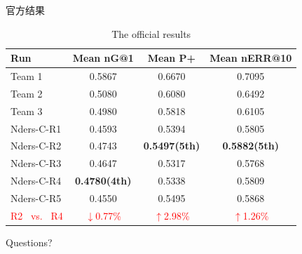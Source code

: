 \documentclass[aspectratio=169]{beamer}
\begin{document}
  \begin{frame}{官方结果}
    \begin{table}
\centering
\caption{The official results}
\label{tab:commands}
\begin{minipage}{\columnwidth}
\begin{center}
\begin{tabular}{|l|c|c|c|}
\hline
 Run        &  Mean nG@1  &  Mean P+  &  Mean nERR@10  \\ \hline
 Team 1 & 0.5867 & 0.6670 & 0.7095 \\ \hline
 Team 2 & 0.5080 & 0.6080 & 0.6492 \\ \hline
 Team 3 & 0.4980 & 0.5818 & 0.6105 \\ \hline
 Nders-C-R1 & 0.4593 & 0.5394 & 0.5805 \\ \hline
 Nders-C-R2 & 0.4743 & \textbf{0.5497(5th)} & \textbf{0.5882(5th)} \\ \hline
 Nders-C-R3 & 0.4647 & 0.5317 & 0.5768 \\ \hline
 Nders-C-R4 & \textbf{0.4780(4th)} & 0.5338 & 0.5809 \\ \hline
 Nders-C-R5 & 0.4550 & 0.5495 & 0.5868 \\ \hline
 \textcolor{red}{R2 \ vs. \  R4}  & \textcolor{red}{$\downarrow$0.77\%} & \textcolor{red}{$\uparrow$2.98\%} & \textcolor{red}{$\uparrow$1.26\%} \\ \hline

\end{tabular}
\end{center}
\end{minipage}
\end{table}
  \end{frame}

  \begin{frame}[standout]
    Questions?
  \end{frame}
\end{document}
